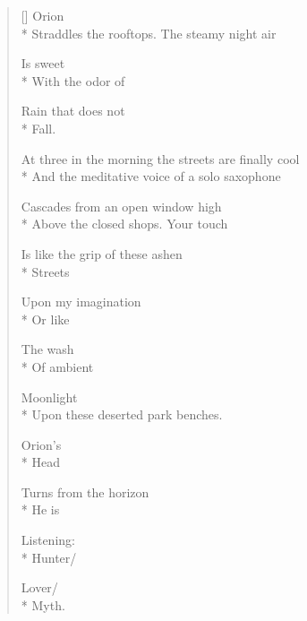 \label{ch:constellation}
\settowidth{\versewidth}{At three in the morning the streets are finally cool}
\begin{verse}[\versewidth]
 \qquad  \qquad  \qquad Orion\\*
Straddles the rooftops.  The steamy night air

Is sweet \\*
With the odor of

Rain that does not \\*
Fall.

At three in the morning the streets are finally cool\\*
And the meditative voice of a solo saxophone

Cascades from an open window high\\*
Above the closed shops. \qquad  \qquad Your touch

Is like the grip of these ashen\\*
Streets

Upon my imagination\\*
Or like

The wash\\*
Of ambient

Moonlight\\*
Upon these deserted park benches.

Orion's \\*
Head

Turns from the horizon\\*
He is

Listening:\\*
Hunter/

Lover/\\*
Myth.
\end{verse}
